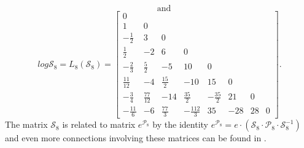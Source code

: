 \begin{example}
\begin{displaymath}
\quad\text{and}
\end{displaymath}
\begin{displaymath}
log{\mathcal{S}_{8}} = {L_{ 8 }}{\left (\mathcal{S}_{ 8 } \right )} = \left[\begin{matrix}0 &  &  &  &  &  &  & \\1 & 0  &  &  &  &  &  & \\- \frac{1}{2} & 3 & 0 &  &  &  &  & \\\frac{1}{2} & -2 & 6 & 0 &  &  &  & \\- \frac{2}{3} & \frac{5}{2} & -5 & 10 & 0 &  &  & \\\frac{11}{12} & -4 & \frac{15}{2} & -10 & 15 & 0 &  & \\- \frac{3}{4} & \frac{77}{12} & -14 & \frac{35}{2} & - \frac{35}{2} & 21 & 0 & \\- \frac{11}{6} & -6 & \frac{77}{3} & - \frac{112}{3} & 35 & -28 & 28 & 0 \end{matrix}\right].
\end{displaymath}
The matrix $\mathcal{S}_{8}$ is related to matrix $e^{\mathcal{P}_{8}}$ by the identity
$e^{\mathcal{P}_{8}}=e\cdot\left(\mathcal{S}_{8}\cdot \mathcal{P}_{8}\cdot
\mathcal{S}_{8}^{-1}\right)$ and even more connections involving these matrices
can be found in \citep{CHEON200149}.
\end{example}
